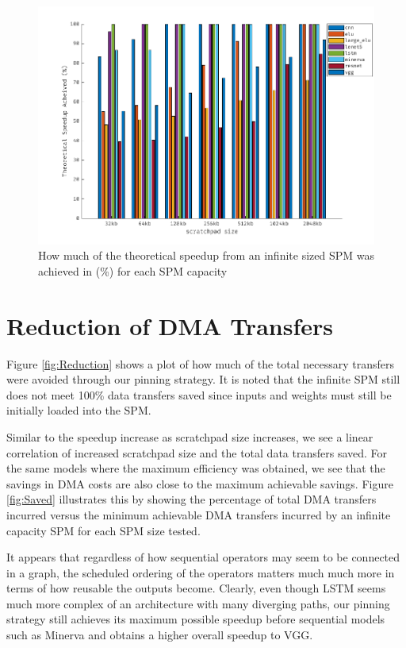 \begin{figure}[!htb]
\centering
\includegraphics[scale=0.7]{Figures/max_acheived.png}
\decoRule
\caption[max]{How much of the theoretical speedup from an infinite sized SPM was achieved in (\%) for each SPM capacity}
\label{fig:max}
\end{figure}


\section{Reduction of DMA Transfers}

Figure \ref{fig:Reduction} shows a plot of how much of the total necessary
transfers were avoided through our pinning strategy. It is noted that the
infinite SPM still does not meet 100\% data transfers saved since inputs and
weights must still be initially loaded into the SPM.

Similar to the speedup increase as scratchpad size increases, we see a linear
correlation of increased scratchpad size and the total data transfers saved.
For the same models where the maximum efficiency was obtained, we see that the
savings in DMA costs are also close to the maximum achievable savings. Figure
\ref{fig:Saved} illustrates this by showing the percentage of total DMA
transfers incurred versus the minimum achievable DMA transfers incurred by an
infinite capacity SPM for each SPM size tested.

It appears that regardless of how sequential operators may seem to be connected
in a graph, the scheduled ordering of the operators matters much much more in
terms of how reusable the outputs become. Clearly, even though LSTM seems much
more complex of an architecture with many diverging paths, our pinning strategy
still achieves its maximum possible speedup before sequential models such as
Minerva and obtains a higher overall speedup to VGG.

